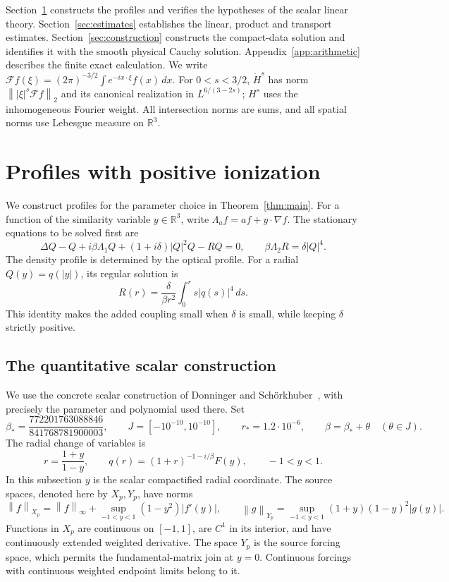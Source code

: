 \documentclass[11pt]{article}
\numberwithin{equation}{section}
\theoremstyle{remark}
\newcommand{\R}{\mathbb R}
\newcommand{\norm}[1]{\left\|#1\right\|}
\newcommand{\dH}{\dot H}
\newcommand{\Lam}[1]{\Lambda_{#1}}
\begin{document}
Section~\ref{sec:profiles} constructs the profiles and verifies the
hypotheses of the scalar linear theory. Section~\ref{sec:estimates}
establishes the linear, product and transport estimates.
Section~\ref{sec:construction} constructs the compact-data solution and
identifies it with the smooth physical Cauchy solution.
Appendix~\ref{app:arithmetic} describes the finite exact calculation.
We write $\mathcal Ff(\xi)=(2\pi)^{-3/2}\int e^{-ix\cdot\xi}f(x)\,dx$.
For $0<s<3/2$, $\dH^s$ has norm
$\norm{|\xi|^s\mathcal Ff}_2$ and its canonical realization in
$L^{6/(3-2s)}$; $H^s$ uses the inhomogeneous Fourier weight.
All intersection norms are sums, and all spatial norms use Lebesgue
measure on $\R^3$.

\section{Profiles with positive ionization}\label{sec:profiles}

We construct profiles for the parameter choice in Theorem~\ref{thm:main}.
For a function of the similarity variable $y\in\R^3$, write
$\Lam a f=af+y\cdot\nabla f$.
The stationary equations to be solved first are
\begin{equation}\label{eq:stationary}
 \Delta Q-Q+i\beta\Lam1 Q+(1+i\delta)|Q|^2Q-RQ=0,
 \qquad \beta\Lam2 R=\delta|Q|^4.
\end{equation}
The density profile is determined by the optical profile. For a radial
$Q(y)=q(|y|)$, its regular solution is
\begin{equation}\label{eq:density-profile}
 R(r)=\frac{\delta}{\beta r^2}\int_0^r s|q(s)|^4\,ds.
\end{equation}
This identity makes the added coupling small when $\delta$ is small, while
keeping $\delta$ strictly positive.

\subsection{The quantitative scalar construction}\label{subsec:scalar-construction}

We use the concrete scalar construction of Donninger and
Sch\"orkhuber~\cite{DS}, with precisely the parameter and polynomial used
there. Set
\[
 \beta_* =\frac{772201763088846}{841768781900003},\qquad
 J=[-10^{-10},10^{-10}],\qquad r_*=1.2\cdot10^{-6},
 \qquad \beta=\beta_*+\theta\quad(\theta\in J).
\]
The radial change of variables is
\begin{equation}\label{eq:compactification}
 r=\frac{1+y}{1-y},\qquad
 q(r)=(1+r)^{-1-i/\beta}F(y),\qquad -1<y<1.
\end{equation}
In this subsection $y$ is the scalar compactified radial coordinate.
The source spaces, denoted here by $X_p,Y_p$, have norms
\[
 \norm f_{X_p}=\norm f_\infty+
       \sup_{-1<y<1}(1-y^2)|f'(y)|,
 \qquad
 \norm g_{Y_p}=\sup_{-1<y<1}(1+y)(1-y)^2|g(y)|.
\]
Functions in $X_p$ are continuous on $[-1,1]$, are $C^1$ in its interior,
and have continuously extended weighted derivative. The space $Y_p$ is
the source forcing space, which permits the fundamental-matrix join at
$y=0$. Continuous forcings with continuous weighted endpoint limits belong
to it.
\end{document}
